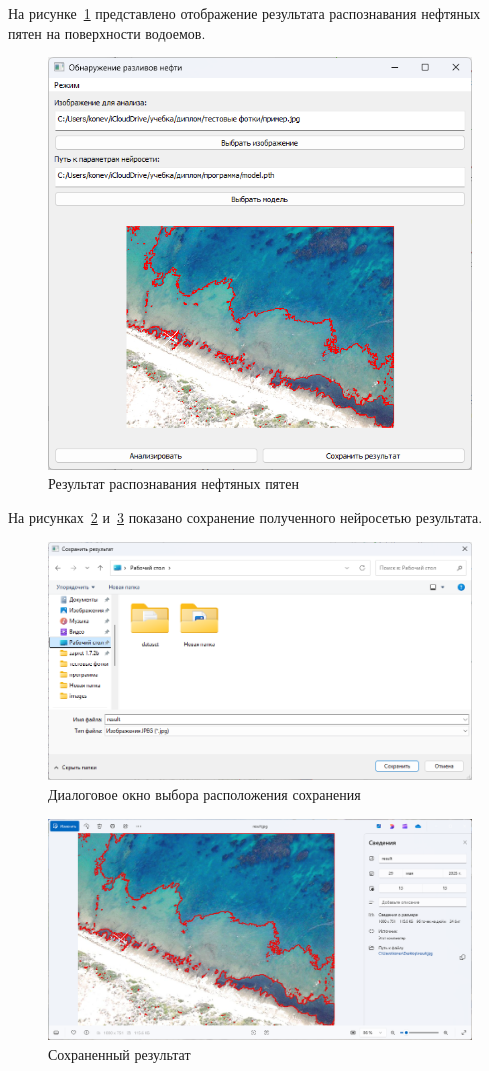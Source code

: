 На рисунке~\ref{fig:analysis_result} представлено отображение результата распознавания нефтяных пятен на поверхности водоемов.
\begin{figure}[H]
	\centering
	\includegraphics[width=0.7\linewidth]{"images/результат анализа"}
	\caption{Результат распознавания нефтяных пятен}
	\label{fig:analysis_result}
\end{figure}

На рисунках~\ref{fig:save_result} и~\ref{fig:saved_result} показано сохранение полученного нейросетью результата.
\begin{figure}[H]
	\centering
	\includegraphics[width=0.7\linewidth]{"images/диалог сохранения"}
	\caption{Диалоговое окно выбора расположения сохранения}
	\label{fig:save_result}
\end{figure}
\begin{figure}[H]
	\centering
	\includegraphics[width=0.7\linewidth]{"images/сохраненное пятно"}
	\caption{Сохраненный результат}
	\label{fig:saved_result}
\end{figure}


